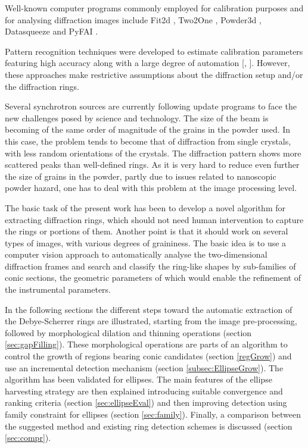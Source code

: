 \documentclass[preprint]{iucr}              %
\begin{document}
Well-known computer programs commonly employed for calibration purposes and for 
analysing diffraction images include Fit2d \cite{hammersley2016fit2d}, Two2One
\cite{vogel2005two2one}, Powder3d \cite{hinrichsen2006powder3d}, Datasqueeze
\cite{heiney2005software} and PyFAI \cite{kieffer2013pyfai}. 

Pattern recognition techniques were developed to estimate calibration parameters
featuring high accuracy along with a large degree of automation
[\cite{rajiv2007automatic}, \cite{cervellino2006folding}].  
However, these approaches make restrictive assumptions about the diffraction
setup and/or the diffraction rings. 

Several synchrotron sources are currently following update programs to face the
new challenges posed by science and technology.  
The size of the beam is becoming of the same order of magnitude of the grains in
the powder used. 
In this case, the problem tends to become that of diffraction from single
crystals, with less random orientations of the crystals. 
The diffraction pattern shows more scattered peaks than well-defined rings. 
As it is very hard to reduce even further the size of grains in the powder,
partly due to issues related to nanoscopic powder hazard, one has to deal with
this problem at the image processing level.  

The basic task of the present work has been to develop a novel algorithm for
extracting diffraction rings, which should not need human intervention to
capture the rings or portions of them.  
Another point is that it should work on several types of images, with various
degrees of graininess. 
The basic idea is to use a computer vision approach to automatically analyse the
two-dimensional diffraction frames and search and classify the ring-like shapes
by sub-families of conic sections, the geometric parameters of which would
enable the refinement of the instrumental parameters.   

In the following sections the different steps toward the automatic extraction of
the Debye-Scherrer rings are illustrated, starting from the image
pre-processing, followed by morphological dilation and thinning operations
(section \ref{sec:gapFilling}).   
These morphological operations are parts of an algorithm to control the growth
of regions bearing conic candidates (section \ref{regGrow}) and use an
incremental detection mechanism (section \ref{subsec:EllipseGrow}).  
The algorithm has been validated for ellipses. 
The main features of the ellipse harvesting strategy are then explained
introducing suitable convergence and ranking criteria (section
\ref{sec:ellipseEval}) and then improving detection using family constraint for
ellipses (section \ref{sec:family}).   
Finally, a comparison between the suggested method and existing ring detection
schemes is discussed (section \ref{sec:compr}). 
\end{document}
